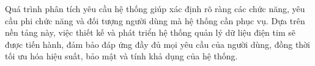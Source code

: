 Quá trình phân tích yêu cầu hệ thống giúp xác định rõ ràng các chức năng, yêu cầu phi chức năng và đối tượng người dùng mà hệ thống cần phục vụ. 
Dựa trên nền tảng này, việc thiết kế và phát triển hệ thống quản lý dữ liệu điện tim sẽ được tiến hành, đảm bảo đáp ứng đầy đủ mọi yêu cầu của người dùng, đồng thời 
tối ưu hóa hiệu suất, bảo mật và tính khả dụng của hệ thống.

\newpage